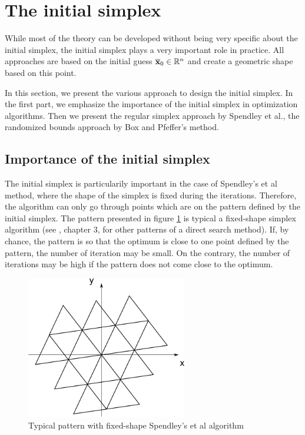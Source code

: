 \section{The initial simplex}

While most of the theory can be developed without being very specific 
about the initial simplex, the initial simplex plays a very important role in practice.
All approaches are based on the initial guess $\overline{\mathbf{x}}_0\in\mathbb{R}^n$ and create a 
geometric shape based on this point.

In this section, we present the various approach to design the initial 
simplex. In the first part, we emphasize the importance of the initial
simplex in optimization algorithms. Then we present the regular simplex 
approach by Spendley et al., the randomized bounds approach by Box and 
Pfeffer's method.

\subsection{Importance of the initial simplex}

The initial simplex is particularily important in the case of Spendley's et al 
method, where the shape of the simplex is fixed during the iterations.
Therefore, the algorithm can only go through points which are on the pattern
defined by the initial simplex. The pattern presented in figure \ref{fig-nm-simplex-fixedshape}
is typical a fixed-shape simplex algorithm (see \cite{Torczon89multi-directionalsearch}, chapter 3, 
for other patterns of a direct search method).
If, by chance, the pattern is so that the optimum is close to one point 
defined by the pattern, the number of iteration may be small. On the contrary, the 
number of iterations may be high if the pattern does not come close to the 
optimum.

\begin{figure}
\begin{center}
\includegraphics[width=7cm]{simplex_initialfixed.png}
\end{center}
\caption{Typical pattern with fixed-shape Spendley's et al algorithm}
\label{fig-nm-simplex-fixedshape}
\end{figure}

